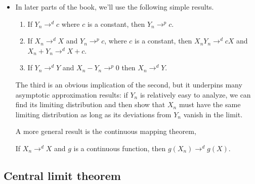 \begin{itemize}[leftmargin=0pt]
\item In later parts of the book, we'll use the following simple
  results.
  \begin{enumerate}
  \item If $Y_n \to^d c$ where $c$ is a constant, then $Y_n \to^p c$.
  \item If $X_n \to^d X$ and $Y_n \to^p c$, where $c$ is a constant, then
    $X_n Y_n \to^d c X$ and $X_n + Y_n \to^d X + c$.
  \item If $Y_n \to^d Y$ and $X_n - Y_n \to^p 0$ then $X_n \to^d Y$.
  \end{enumerate}
  The third is an obvious implication of the second, but it underpins
  many asymptotic approximation results: if $Y_n$ is relatively easy
  to analyze, we can find its limiting distribution and then show
  that $X_n$ must have the same limiting distribution as long as its
  deviations from $Y_n$ vanish in the limit.

  A more general result is the continuous mapping theorem,
  \begin{thm}
    If $X_n \to^d X$ and $g$ is a continuous function, then $g(X_n) \to^d
    g(X)$.
  \end{thm}
  
\end{itemize}

\subsection{Central limit theorem}


